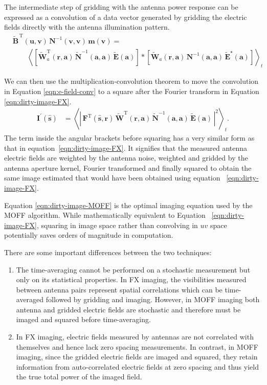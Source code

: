 \documentclass[a4paper,fleqn,usenatbib]{../mnras}
\begin{document}
The intermediate step of gridding with the antenna power response can be 
expressed as a convolution of a data vector generated by gridding the electric fields 
directly with the antenna illumination pattern.
\begin{align}
&\widetilde{\mathbf{B}}^{\,\textrm{T}}(\mathbf{u},\mathbf{v})\,\mathbf{N}^{-1}(\mathbf{v} ,\mathbf{v})\,\mathbf{m}(\mathbf{v})=\nonumber\\
&\qquad\left\langle \left[\widetilde{\mathbf{W}}^\textrm{T}_a(\mathbf{r},\mathbf{a})\, \widetilde{\mathbf{N}}^{-1}\!(\mathbf{a},\mathbf{a})\, \widetilde{\mathbf{E}}(\mathbf{a})\right]
\ast\left[\widetilde{\mathbf{W}}_a(\mathbf{r},\mathbf{a})\, \mathbf{N}^{-1}\!(\mathbf{a},\mathbf{a})\, \widetilde{\mathbf{E}}^\star(\mathbf{a})\right]\right\rangle_t\label{eqn:e-field-conv}
\end{align}

We can then use the multiplication-convolution theorem to move the convolution in 
Equation \ref{eqn:e-field-conv} to a square after the Fourier transform in Equation 
\ref{eqn:dirty-image-FX}.
\begin{align}
  \mathbf{I}^\prime(\hat{\mathbf{s}}) &= \left\langle \left|\,\mathbf{F}^\textrm{T}(\hat{\mathbf{s}},\mathbf{r})\,\widetilde{\mathbf{W}}^\textrm{T}(\mathbf{r},\mathbf{a})\,\widetilde{\mathbf{N}}^{-1}(\mathbf{a},\mathbf{a})\,\widetilde{\mathbf{E}}(\mathbf{a})\,\right|^2\right\rangle_t. \label{eqn:dirty-image-MOFF}
\end{align}
The term inside the angular brackets before squaring has a very similar form as
that in equation~\ref{eqn:dirty-image-FX}. It signifies that the measured antenna
electric fields are weighted by the antenna noise, weighted and gridded by the
antenna aperture kernel, Fourier transformed and finally squared to obtain the
same image estimated that would have been obtained using equation~
\ref{eqn:dirty-image-FX}. 

Equation \ref{eqn:dirty-image-MOFF} is the optimal imaging equation used by the 
MOFF algorithm. While mathematically equivalent to Equation~
\ref{eqn:dirty-image-FX}, squaring in image space rather than convolving in $uv$ 
space potentially saves orders of magnitude in computation.

There are some important differences between the two techniques:
\begin{enumerate}
\item The time-averaging cannot be performed on a stochastic measurement but
  only on its statistical properties. In FX imaging, the visibilities measured
  between antenna pairs represent spatial correlations which can be time-averaged
  followed by gridding and imaging. However, in MOFF imaging both antenna and 
  gridded electric fields are stochastic and therefore must be imaged and squared 
  before time-averaging. 
\item In FX imaging, electric fields measured by antennas are not correlated with
  themselves and hence lack zero spacing measurements. In contrast, in MOFF
  imaging, since the gridded electric fields are imaged and squared, they retain 
  information from auto-correlated electric fields at zero spacing and thus yield 
  the true total power of the imaged field.
\end{enumerate} 
\end{document}
